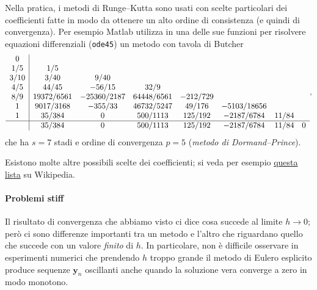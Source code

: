 \documentclass[a4paper]{report}
\theoremstyle{definiton}
\theoremstyle{remark}
\newcommand{\y}{\mathbf{y}}
\begin{document}
Nella pratica, i metodi di Runge--Kutta sono usati con scelte particolari dei coefficienti fatte in modo da ottenere un alto ordine di consistenza (e quindi di convergenza). Per esempio Matlab utilizza in una delle sue funzioni per risolvere equazioni differenziali (\lstinline{ode45}) un metodo con tavola di Butcher
\[
\begin{array}{c|ccccccc}
    0\\
    1/5 &    1/5\\
    3/10 &   3/40 &   9/40\\
    4/5 &    44/45 &  -56/15 &  32/9\\
    8/9   &  19372/6561 & -25360/2187  &   64448/6561 & -212/729\\
    1 &  9017/3168  & -355/33   &  46732/5247 & 49/176 & -5103/18656\\
    1 &  35/384 & 0 &  500/1113  &  125/192   &  -2187/6784 & 11/84   \\
    \hline
    &  35/384 & 0 &  500/1113  &  125/192   &  -2187/6784 & 11/84 & 0  \\
\end{array},
\]
che ha $s=7$ stadi e ordine di convergenza $p=5$ (\emph{metodo di Dormand--Prince}).

Esistono molte altre possibili scelte dei coefficienti; si veda per esempio \href{https://en.wikipedia.org/wiki/List_of_Runge%E2%80%93Kutta_methods}{questa lista} su Wikipedia.

\paragraph{Problemi stiff}


Il risultato di convergenza che abbiamo visto ci dice cosa succede al limite $h \to 0$; però ci sono differenze importanti tra un metodo e l'altro che riguardano quello che succede con un valore \emph{finito} di $h$. In particolare, non è difficile osservare in esperimenti numerici che prendendo $h$ troppo grande il metodo di Eulero esplicito produce sequenze $\y_n$ oscillanti anche quando la soluzione vera converge a zero in modo monotono.
\end{document}
